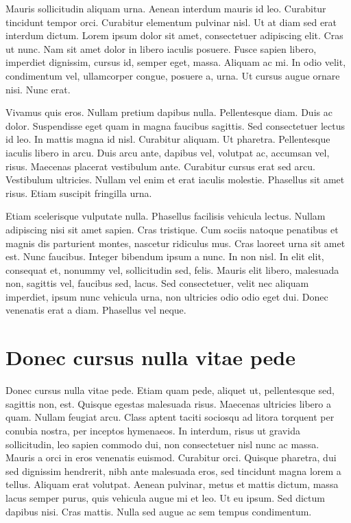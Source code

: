 Mauris sollicitudin aliquam urna. Aenean interdum mauris id
leo. Curabitur tincidunt tempor orci. Curabitur elementum pulvinar
nisl. Ut at diam sed erat interdum dictum. Lorem ipsum dolor sit amet,
consectetuer adipiscing elit. Cras ut nunc. Nam sit amet dolor in
libero iaculis posuere. Fusce sapien libero, imperdiet dignissim,
cursus id, semper eget, massa. Aliquam ac mi. In odio velit,
condimentum vel, ullamcorper congue, posuere a, urna. Ut cursus augue
ornare nisi. Nunc erat.

Vivamus quis eros. Nullam pretium dapibus nulla. Pellentesque
diam. Duis ac dolor. Suspendisse eget quam in magna faucibus
sagittis. Sed consectetuer lectus id leo. In mattis magna id
nisl. Curabitur aliquam. Ut pharetra. Pellentesque iaculis libero in
arcu. Duis arcu ante, dapibus vel, volutpat ac, accumsan vel,
risus. Maecenas placerat vestibulum ante. Curabitur cursus erat sed
arcu. Vestibulum ultricies. Nullam vel enim et erat iaculis
molestie. Phasellus sit amet risus. Etiam suscipit fringilla urna.

Etiam scelerisque vulputate nulla. Phasellus facilisis vehicula
lectus. Nullam adipiscing nisi sit amet sapien. Cras tristique. Cum
sociis natoque penatibus et magnis dis parturient montes, nascetur
ridiculus mus. Cras laoreet urna sit amet est. Nunc faucibus. Integer
bibendum ipsum a nunc. In non nisl. In elit elit, consequat et,
nonummy vel, sollicitudin sed, felis. Mauris elit libero, malesuada
non, sagittis vel, faucibus sed, lacus. Sed consectetuer, velit nec
aliquam imperdiet, ipsum nunc vehicula urna, non ultricies odio odio
eget dui. Donec venenatis erat a diam. Phasellus vel neque.

\appendix
\chapter{Donec cursus nulla vitae pede}
Donec cursus nulla vitae pede. Etiam quam pede, aliquet ut,
pellentesque sed, sagittis non, est. Quisque egestas malesuada
risus. Maecenas ultricies libero a quam. Nullam feugiat arcu. Class
aptent taciti sociosqu ad litora torquent per conubia nostra, per
inceptos hymenaeos. In interdum, risus ut gravida sollicitudin, leo
sapien commodo dui, non consectetuer nisl nunc ac massa. Mauris a orci
in eros venenatis euismod. Curabitur orci. Quisque pharetra, dui sed
dignissim hendrerit, nibh ante malesuada eros, sed tincidunt magna
lorem a tellus. Aliquam erat volutpat. Aenean pulvinar, metus et
mattis dictum, massa lacus semper purus, quis vehicula augue mi et
leo. Ut eu ipsum. Sed dictum dapibus nisi. Cras mattis. Nulla sed
augue ac sem tempus condimentum.

